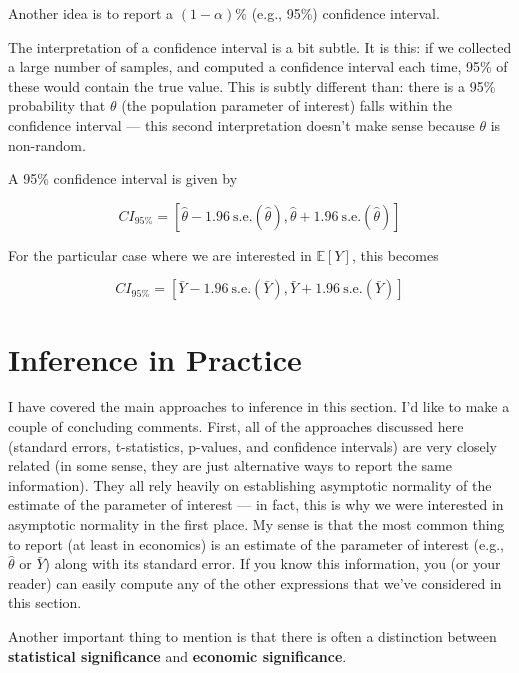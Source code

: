 \documentclass[
  letterpaper,
  DIV=11,
  numbers=noendperiod]{scrreprt}
\begin{document}
Another idea is to report a \((1-\alpha)\%\) (e.g., 95\%) confidence
interval.

The interpretation of a confidence interval is a bit subtle. It is this:
if we collected a large number of samples, and computed a confidence
interval each time, 95\% of these would contain the true value. This is
subtly different than: there is a 95\% probability that \(\theta\) (the
population parameter of interest) falls within the confidence interval
--- this second interpretation doesn't make sense because \(\theta\) is
non-random.

A 95\% confidence interval is given by

\[
  CI_{95\%} = \left[\hat{\theta} - 1.96 \ \textrm{s.e.}(\hat{\theta}), \hat{\theta} + 1.96 \  \textrm{s.e.}(\hat{\theta})\right]
\]

For the particular case where we are interested in \(\mathbb{E}[Y]\),
this becomes

\[
  CI_{95\%} = \left[ \bar{Y} - 1.96 \ \textrm{s.e.}(\bar{Y}), \bar{Y} + 1.96 \ \textrm{s.e.}(\bar{Y}) \right]
\]

\section{Inference in Practice}\label{inference-in-practice}

I have covered the main approaches to inference in this section. I'd
like to make a couple of concluding comments. First, all of the
approaches discussed here (standard errors, t-statistics, p-values, and
confidence intervals) are very closely related (in some sense, they are
just alternative ways to report the same information). They all rely
heavily on establishing asymptotic normality of the estimate of the
parameter of interest --- in fact, this is why we were interested in
asymptotic normality in the first place. My sense is that the most
common thing to report (at least in economics) is an estimate of the
parameter of interest (e.g., \(\hat{\theta}\) or \(\bar{Y}\)) along with
its standard error. If you know this information, you (or your reader)
can easily compute any of the other expressions that we've considered in
this section.

Another important thing to mention is that there is often a distinction
between \textbf{statistical significance} and \textbf{economic
significance}.
\end{document}
